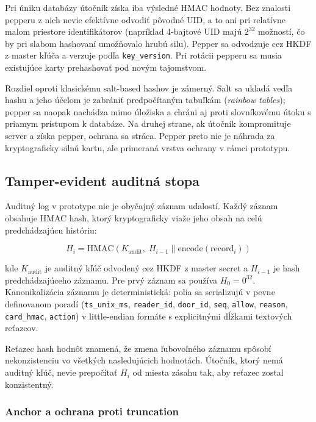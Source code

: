 \documentclass[journal,a4paper,onecolumn]{IEEEtran}
\begin{document}
Pri úniku databázy útočník získa iba výsledné HMAC hodnoty. Bez znalosti pepperu z nich nevie efektívne odvodiť pôvodné UID, a to ani pri relatívne malom priestore identifikátorov (napríklad 4-bajtové UID majú $2^{32}$ možností, čo by pri slabom hashovaní umožňovalo hrubú silu)\cite{FIPS1981}. Pepper sa odvodzuje cez HKDF z master kľúča a verzuje podľa \texttt{key\_version}. Pri rotácii pepperu sa musia existujúce karty prehashovať pod novým tajomstvom.

Rozdiel oproti klasickému salt-based hashov je zámerný. Salt sa ukladá vedľa hashu a jeho účelom je zabrániť predpočítaným tabuľkám (\emph{rainbow tables}); pepper sa naopak nachádza mimo úložiska a chráni aj proti slovníkovému útoku s priamym prístupom k databáze. Na druhej strane, ak útočník kompromituje server a získa pepper, ochrana sa stráca. Pepper preto nie je náhrada za kryptograficky silnú kartu, ale primeraná vrstva ochrany v rámci prototypu.

\subsection{Tamper-evident auditná stopa}

Auditný log v prototype nie je obyčajný záznam udalostí. Každý záznam obsahuje HMAC hash, ktorý kryptograficky viaže jeho obsah na celú predchádzajúcu históriu:

\begin{equation}
H_i = \mathrm{HMAC}(K_{\text{audit}},\; H_{i-1} \parallel \mathrm{encode}(\text{record}_i))
\end{equation}

kde $K_{\text{audit}}$ je auditný kľúč odvodený cez HKDF z master secret a $H_{i-1}$ je hash predchádzajúceho záznamu. Pre prvý záznam sa používa $H_0 = 0^{32}$. Kanonikalizácia záznamu je deterministická: polia sa serializujú v pevne definovanom poradí (\texttt{ts\_unix\_ms}, \texttt{reader\_id}, \texttt{door\_id}, \texttt{seq}, \texttt{allow}, \texttt{reason}, \texttt{card\_hmac}, \texttt{action}) v little-endian formáte s explicitnými dĺžkami textových reťazcov\cite{SchneierKelsey1999}.

Reťazec hash hodnôt znamená, že zmena ľubovoľného záznamu spôsobí nekonzistenciu vo všetkých nasledujúcich hodnotách. Útočník, ktorý nemá auditný kľúč, nevie prepočítať $H_i$ od miesta zásahu tak, aby reťazec zostal konzistentný.

\subsubsection{Anchor a ochrana proti truncation}
\end{document}
